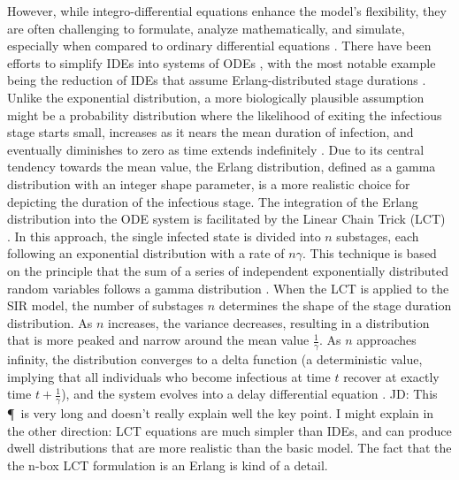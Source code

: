 \documentclass[12pt]{article}
\begin{document}
However, while integro-differential equations enhance the model's flexibility, they are often challenging to formulate, analyze mathematically, and simulate, especially when compared to ordinary differential equations \cite{krylova2013effects}\cite{hurtado2019generalizations}\cite{burton2005volterra}. There have been efforts to simplify IDEs into systems of ODEs \cite{macdonald2008biological}\cite{ponosov2004thew}\cite{burton2005volterra}\cite{goltser2013reducing}\cite{diekmann2018finite}, with the most notable example being the reduction of IDEs that assume Erlang-distributed stage durations \cite{hurtado2019generalizations}. Unlike the exponential distribution, a more biologically plausible assumption might be a probability distribution where the likelihood of exiting the infectious stage starts small, increases as it nears the mean duration of infection, and eventually diminishes to zero as time extends indefinitely \cite{sartwell1966incubation}\cite{bailey1954statistical}. Due to its central tendency towards the mean value, the Erlang distribution, defined as a gamma distribution with an integer shape parameter, is a more realistic choice for depicting the duration of the infectious stage. The integration of the Erlang distribution into the ODE system is facilitated by the Linear Chain Trick (LCT) \cite{macdonald1978time}\cite{smith2011introduction}. In this approach, the single infected state is divided into $n$ substages, each following an exponential distribution with a rate of $n\gamma$. This technique is based on the principle that the sum of a series of independent exponentially distributed random variables follows a gamma distribution \cite{krylova2013effects}\cite{therrien2018probability}. When the LCT is applied to the SIR model, the number of substages $n$ determines the shape of the stage duration distribution. As $n$ increases, the variance decreases, resulting in a distribution that is more peaked and narrow around the mean value $\frac{1}{\gamma}$. As $n$ approaches infinity, the distribution converges to a delta function (a deterministic value, implying that all individuals who become infectious at time $t$ recover at exactly time $t + \frac{1}{\gamma}$), and the system evolves into a delay differential equation \cite{krylova2013effects}\cite{hethcote1980integral}.
JD: This \P\ is very long and doesn't really explain well the key point. I might explain in the other direction: LCT equations are much simpler than IDEs, and can produce dwell distributions that are more realistic than the basic model. The fact that the the n-box LCT formulation is an Erlang is kind of a detail.
\end{document}
